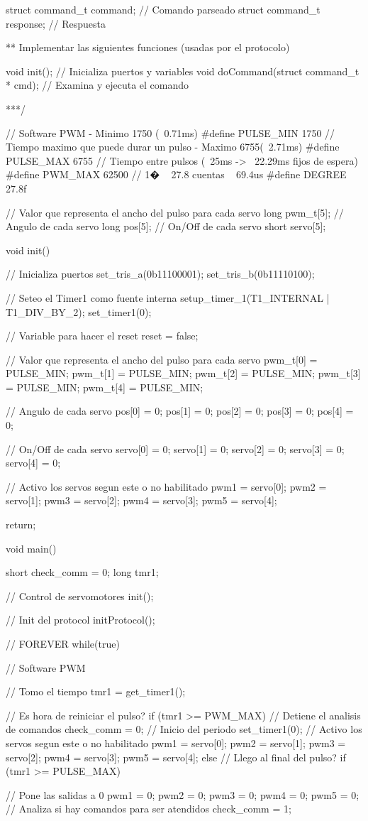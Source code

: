 {\begin{verbatimtab}
struct command_t command; 	// Comando parseado
struct command_t response; 	// Respuesta

** Implementar las siguientes funciones (usadas por el protocolo)

void init(); // Inicializa puertos y variables
void doCommand(struct command_t * cmd); // Examina y ejecuta el comando

***/

// Software PWM - Minimo 1750 (~0.71ms)
#define PULSE_MIN	1750
// Tiempo maximo que puede durar un pulso - Maximo 6755(~2.71ms)
#define PULSE_MAX	6755
// Tiempo entre pulsos (~25ms -> ~22.29ms fijos de espera)
#define PWM_MAX		62500
// 1� ~ 27.8 cuentas ~ 69.4us
#define DEGREE		27.8f

// Valor que representa el ancho del pulso para cada servo
long pwm_t[5];
// Angulo de cada servo
long pos[5];
// On/Off de cada servo
short servo[5];

void init()
{
	// Inicializa puertos
	set_tris_a(0b11100001);
	set_tris_b(0b11110100);

	// Seteo el Timer1 como fuente interna
	setup_timer_1(T1_INTERNAL | T1_DIV_BY_2);
	set_timer1(0);

	// Variable para hacer el reset
	reset = false;

	// Valor que representa el ancho del pulso para cada servo
	pwm_t[0] = PULSE_MIN;
	pwm_t[1] = PULSE_MIN;
	pwm_t[2] = PULSE_MIN;
	pwm_t[3] = PULSE_MIN;
	pwm_t[4] = PULSE_MIN;
	
	// Angulo de cada servo
	pos[0] = 0;
	pos[1] = 0;
	pos[2] = 0;
	pos[3] = 0;
	pos[4] = 0;
	
	// On/Off de cada servo
	servo[0] = 0;
	servo[1] = 0;
	servo[2] = 0;
	servo[3] = 0;
	servo[4] = 0;
	
	// Activo los servos segun este o no habilitado
	pwm1 = servo[0];
	pwm2 = servo[1];
	pwm3 = servo[2];
	pwm4 = servo[3];
	pwm5 = servo[4];
	
	return;	
}	

void main()
{
	short check_comm = 0;
	long tmr1;
	
	// Control de servomotores
	init();

	// Init del protocol
	initProtocol();

	// FOREVER
	while(true)
	{
		// Software PWM

		// Tomo el tiempo
		tmr1 = get_timer1();
		
		// Es hora de reiniciar el pulso?
		if (tmr1 >= PWM_MAX)
		{
			// Detiene el analisis de comandos
			check_comm = 0;
			// Inicio del periodo
			set_timer1(0);
			// Activo los servos segun este o no habilitado
			pwm1 = servo[0];
			pwm2 = servo[1];
			pwm3 = servo[2];
			pwm4 = servo[3];
			pwm5 = servo[4];
		} else
		// Llego al final del pulso?
		if (tmr1 >= PULSE_MAX)
		{
			// Pone las salidas a 0
			pwm1 = 0;
			pwm2 = 0;
			pwm3 = 0;
			pwm4 = 0;
			pwm5 = 0;
			// Analiza si hay comandos para ser atendidos
			check_comm = 1;
			
}}}
\end{verbatimtab}}
